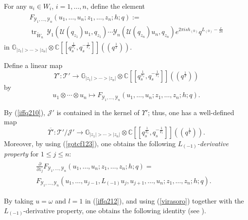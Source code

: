 \documentclass[9pt]{amsart}
\newcommand{\T}{\mathcal{T}}
\newcommand{\J}{\mathcal{J}}
\begin{document}
For any $u_i \in W_i$, $i = 1, \dots, n$, define the element
\begin{align}
\begin{split}
    F_{\mathcal{Y}_{1}, \dots, \mathcal{Y}_{n}}(u_1, \dots, u_n; z_1, \dots, z_n; h; q)
    :=\; \\
    \operatorname{tr}_{\tilde{W}_n} \,
    \mathcal{Y}_1(\mathcal{U}(q_{z_1}) u_1, q_{z_1}) \cdots 
    \mathcal{Y}_n(\mathcal{U}(q_{z_n}) u_n, q_{z_n}) 
    e^{2\pi i s h_{(0)}} q^{L_{(0)} - \frac{c}{24}}
\end{split}
\end{align}
in $\mathbb{G}_{|z_1| > \cdots > |z_n|} \otimes \mathbb{C}[[q_s^{\frac{1}{T_1}}, q_s^{-\frac{1}{T_1}}]]((q^{\frac{1}{T}}))$.

Define a linear map
\[
\Upsilon': \T' \rightarrow \mathbb{G}_{|z_1| > \cdots > |z_n|} \otimes \mathbb{C}[[q_s^{\frac{1}{T_1}}, q_s^{-\frac{1}{T_1}}]]((q^{\frac{1}{T}}))
\]
by
\[
u_1 \otimes \cdots \otimes u_n \mapsto F_{\mathcal{Y}_{1}, \dots, \mathcal{Y}_{n}}(u_1, \dots, u_n; z_1, \dots, z_n; h; q).
\]

\noindent
By (\ref{iffq210}), $\J'$ is contained in the kernel of $\Upsilon'$; thus, one has a well-defined map
\[
\overline{\Upsilon'}: \T' / \J' \rightarrow \mathbb{G}_{|z_1| > \cdots > |z_n|} \otimes \mathbb{C}[[q_s^{\frac{1}{T_1}}, q_s^{-\frac{1}{T_1}}]]((q^{\frac{1}{T}})).
\]
Moreover, by using (\ref{gotcf123}), one obtains the following {\em $L_{(-1)}$-derivative property} for $1\leq j\leq n$:
\begin{align}
\begin{split}
    \frac{\partial}{\partial z_j}
    F_{\mathcal{Y}_{1}, \dots, \mathcal{Y}_{n}}(u_1, \dots, u_n; z_1, \dots, z_n; h; q)
    =\; & \\
    F_{\mathcal{Y}_{1}, \dots, \mathcal{Y}_{n}}(
    u_1, \dots, u_{j-1}, L_{(-1)} u_j, u_{j+1}, \dots, u_n;
    z_1, \dots, z_n; h; q).
\end{split}
\end{align}

By taking $u = \omega$ and $l = 1$ in (\ref{iffq212}), and using (\ref{virasoro}) together with the $L_{(-1)}$-derivative property, one obtains the following identity (see \cite{huang2005differential}).
\end{document}
